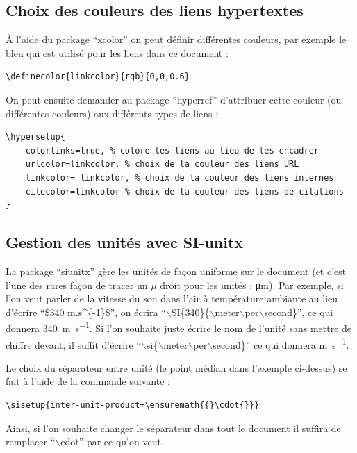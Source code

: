 \subsection{Choix des couleurs des liens hypertextes}
\label{chap1:sec:exemple_hyperref}

À l'aide du package ``xcolor'' on peut définir différentes couleurs, par exemple le bleu qui est utilisé pour les liens dans ce document :
{\small \begin{verbatim}
\definecolor{linkcolor}{rgb}{0,0,0.6}
\end{verbatim}}
\noindent On peut ensuite demander au package ``hyperref'' d'attribuer cette couleur (ou différentes couleurs) aux différents types de liens :
{\small \begin{verbatim}
\hypersetup{
	colorlinks=true, % colore les liens au lieu de les encadrer
	urlcolor=linkcolor, % choix de la couleur des liens URL
	linkcolor= linkcolor, % choix de la couleur des liens internes
	citecolor=linkcolor % choix de la couleur des liens de citations
}
\end{verbatim}}

\subsection{Gestion des unités avec SI-unitx}
\label{chap1:sec:exemple_siunitx}

La package ``siunitx'' gère les unités de façon uniforme sur le document (et c'est l'une des rares façon de tracer un $\mu$ droit pour les unités : \si{\micro\meter}). Par exemple, si l'on veut parler de la vitesse du son dans l'air à température ambiante au lieu d'écrire ``\$340 m.s\^{}\{-1\}\$'', on écrira ``$\backslash$SI\{340\}\{$\backslash$meter$\backslash$per$\backslash$second\}'', ce qui donnera \SI{340}{\meter\per\second}. Si l'on souhaite juste écrire le nom de l'unité sans mettre de chiffre devant, il suffit d'écrire ``$\backslash$si\{$\backslash$meter$\backslash$per$\backslash$second\}'' ce qui donnera \si{\meter\per\second}.\bigskip

Le choix du séparateur entre unité (le point médian dans l'exemple ci-dessus) se fait à l'aide de la commande suivante :
{\small \begin{verbatim}
\sisetup{inter-unit-product=\ensuremath{{}\cdot{}}}
\end{verbatim}}
\noindent Ainsi, si l'on souhaite changer le séparateur dans tout le document il suffira de remplacer ``$\backslash$cdot'' par ce qu'on veut.\bigskip

